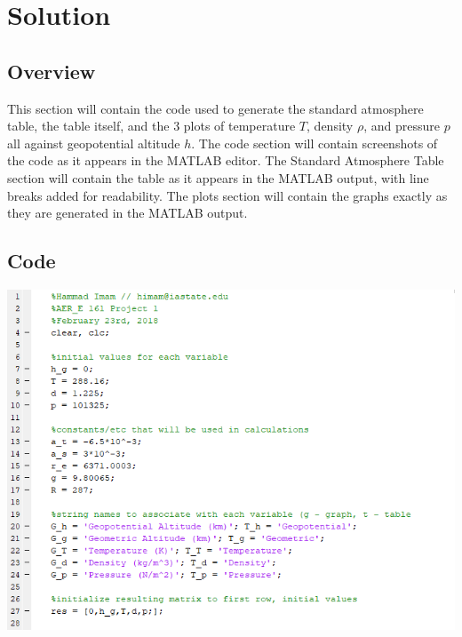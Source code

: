 \documentclass{article}
\begin{document}
\clearpage
\section{Solution}

\subsection{Overview}

This section will contain the code used to generate the standard atmosphere table, the table itself, and the 3 plots of temperature $T$, density $\rho$, and pressure $p$ all against geopotential altitude $h$. The code section will contain screenshots of the code as it appears in the MATLAB editor. The Standard Atmosphere Table section will contain the table as it appears in the MATLAB output, with line breaks added for readability. The plots section will contain the graphs exactly as they are generated in the MATLAB output.

\subsection{Code}
\includegraphics [width=\linewidth]{code1.png}
\end{document}
